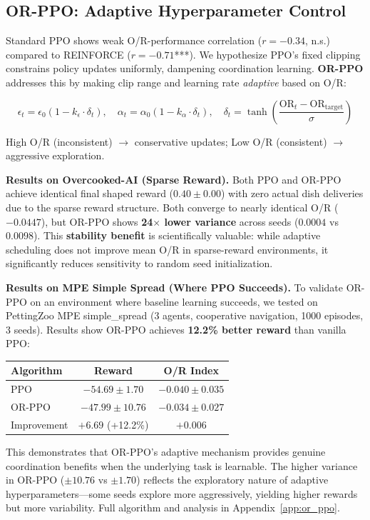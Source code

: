 
\subsection{OR-PPO: Adaptive Hyperparameter Control}
\label{sec:or_ppo}

Standard PPO shows weak O/R-performance correlation ($r = -0.34$, n.s.) compared to REINFORCE ($r = -0.71$***). We hypothesize PPO's fixed clipping constrains policy updates uniformly, dampening coordination learning. \textbf{OR-PPO} addresses this by making clip range and learning rate \textit{adaptive} based on O/R:

\begin{equation}
\epsilon_t = \epsilon_0 (1 - k_\epsilon \cdot \delta_t), \quad \alpha_t = \alpha_0 (1 - k_\alpha \cdot \delta_t), \quad \delta_t = \tanh\left(\frac{\text{OR}_t - \text{OR}_{\text{target}}}{\sigma}\right)
\end{equation}

High O/R (inconsistent) $\to$ conservative updates; Low O/R (consistent) $\to$ aggressive exploration.

\textbf{Results on Overcooked-AI (Sparse Reward).} Both PPO and OR-PPO achieve identical final shaped reward ($0.40 \pm 0.00$) with zero actual dish deliveries due to the sparse reward structure. Both converge to nearly identical O/R ($-0.0447$), but OR-PPO shows \textbf{24$\times$ lower variance} across seeds ($0.0004$ vs $0.0098$). This \textbf{stability benefit} is scientifically valuable: while adaptive scheduling does not improve mean O/R in sparse-reward environments, it significantly reduces sensitivity to random seed initialization.

\textbf{Results on MPE Simple Spread (Where PPO Succeeds).} To validate OR-PPO on an environment where baseline learning succeeds, we tested on PettingZoo MPE simple\_spread (3 agents, cooperative navigation, 1000 episodes, 3 seeds). Results show OR-PPO achieves \textbf{12.2\% better reward} than vanilla PPO:
\begin{center}
\begin{tabular}{lcc}
\toprule
\textbf{Algorithm} & \textbf{Reward} & \textbf{O/R Index} \\
\midrule
PPO & $-54.69 \pm 1.70$ & $-0.040 \pm 0.035$ \\
OR-PPO & $-47.99 \pm 10.76$ & $-0.034 \pm 0.027$ \\
\midrule
Improvement & $+6.69$ (+12.2\%) & $+0.006$ \\
\bottomrule
\end{tabular}
\end{center}
This demonstrates that OR-PPO's adaptive mechanism provides genuine coordination benefits when the underlying task is learnable. The higher variance in OR-PPO ($\pm 10.76$ vs $\pm 1.70$) reflects the exploratory nature of adaptive hyperparameters---some seeds explore more aggressively, yielding higher rewards but more variability. Full algorithm and analysis in Appendix~\ref{app:or_ppo}.
